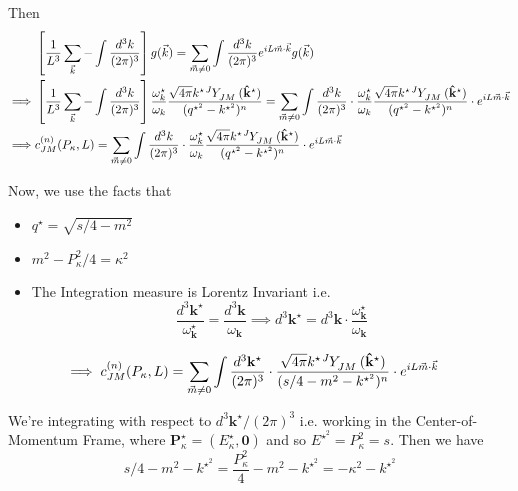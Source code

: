 \documentclass{article}
\begin{document}
Then 
\begin{align*}
  &\left[ \frac{1}{L^3} \sum_{\vec{k}} - \int \frac{d^3 k}{(2\pi)^3} \right] g(\vec{k}) = \sum_{\vec{m} \neq 0} \int \frac{d^3 k}{(2\pi)^3} e^{i L \vec{m} \cdot \vec{k}} g(\vec{k}) \\
  \implies &\left[ \frac{1}{L^3} \sum_{\vec{k}} - \int \frac{d^3 k}{(2\pi)^3} \right] \frac{\omega_k^{\star}}{\omega_{k}} \frac{\sqrt{4\pi} k^{\star} \tensor[^J]{Y}{_{JM}} (\mathbf{\hat{k}}^{\star}) }{(q^{\star^{2}} - k^{\star^{2}})^n } = \sum_{\vec{m} \neq 0} \int \frac{d^3 k}{(2\pi)^3} \cdot \frac{\omega_k^{\star}}{\omega_{k}} \frac{\sqrt{4\pi} k^{\star} \tensor[^J]{Y}{_{JM}} (\mathbf{\hat{k}}^{\star}) }{(q^{\star^{2}} - k^{\star^{2}})^n } \cdot e^{i L \vec{m} \cdot \vec{k}} \\
  \implies & c_{JM}^{(n)}(P_{\kappa}, L) = \sum_{\vec{m} \neq 0} \int \frac{d^3 k}{(2\pi)^3} \cdot \frac{\omega_k^{\star}}{\omega_{k}} \frac{\sqrt{4\pi} k^{\star} \tensor[^J]{Y}{_{JM}} (\mathbf{\hat{k}}^{\star}) }{(q^{\star^{2}} - k^{\star^{2}})^n } \cdot e^{i L \vec{m} \cdot \vec{k}}
\end{align*}

Now, we use the facts that 
\begin{itemize}
  \item $q^{\star} = \sqrt{s/4 - m^2}$
  \item $m^2 - P_{\kappa}^2/4 = \kappa^2$
  \item The Integration measure is Lorentz Invariant i.e. 
  \[ \frac{d^3 \mathbf{k}^{\star} }{\omega_{\mathbf{k}}^{\star}} = \frac{d^3 \mathbf{k} }{\omega_{\mathbf{k}}} \implies d^3 \mathbf{k}^{\star} = d^3 \mathbf{k} \cdot \frac{\omega_{\mathbf{k}}^{\star}}{\omega_{\mathbf{k}}} \]
\end{itemize}

\begin{align*}
  \implies c_{JM}^{(n)}(P_{\kappa}, L) &= \sum_{\vec{m} \neq 0} \int \frac{d^3 \mathbf{k}^{\star}}{(2\pi)^3} \cdot \frac{\sqrt{4\pi} k^{\star} \tensor[^J]{Y}{_{JM}} (\mathbf{\hat{k}}^{\star}) }{(s/4 - m^2 - k^{\star^{2}})^n } \cdot e^{i L \vec{m} \cdot \vec{k}} 
\end{align*}

We're integrating with respect to $d^3 \mathbf{k}^{\star} / (2\pi)^3$ i.e. working in the Center-of-Momentum Frame, where $\mathbf{P}_{\kappa}^{\star} = (E_{\kappa}^{\star}, \mathbf{0})$ and so $E^{\star^2} = P_{\kappa}^2 = s$. Then we have 
\[ s/4 - m^2 - k^{\star^2} = \frac{P_{\kappa}^2}{4} - m^2 - k^{\star^2} = -\kappa^2 - k^{\star^2} \] 
\end{document}
